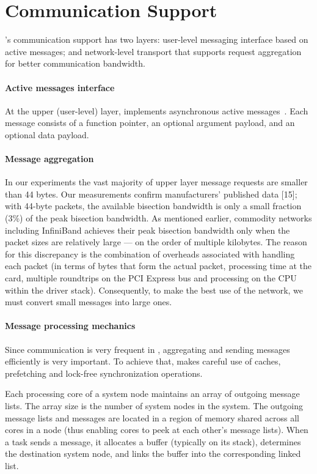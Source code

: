 \section{Communication Support}
\label{sec:communication}

\Grappa's communication support has two layers: user-level messaging interface
based on active messages; and network-level transport that supports request
aggregation for better communication bandwidth.

\paragraph{Active messages interface} At the upper (user-level) layer, \Grappa
implements asynchronous active messages~\cite{vonEicken92}. Each message
consists of a function pointer, an optional argument payload, and an optional
data payload. 

\paragraph{Message aggregation} In our experiments the vast majority of upper
layer message requests are smaller than 44 bytes. Our measurements confirm
manufacturers' published data [15]; with 44-byte packets, the available
bisection bandwidth is only a small fraction (3\%) of the peak bisection
bandwidth. As mentioned earlier, commodity networks including InfiniBand
achieves their peak bisection bandwidth only when the packet sizes are
relatively large --- on the order of multiple kilobytes. The reason for this
discrepancy is the combination of overheads associated with handling each
packet (in terms of bytes that form the actual packet, processing time at the
card, multiple roundtrips on the PCI Express bus and processing on the CPU
within the driver stack). Consequently, to make the best use of the network,
we must convert small messages into large ones.

\paragraph{Message processing mechanics} Since communication is very frequent
in \Grappa, aggregating and sending messages efficiently is very important. To
achieve that, \Grappa makes careful use of caches, prefetching and lock-free
synchronization operations.

Each processing core of a system node maintains an array of outgoing message lists.  The array size is the number of system nodes in the \Grappa system.   The outgoing message lists and messages are located in a region of memory shared across all cores in a \Grappa node (thus enabling cores to peek at each other's message lists). When a task sends a message, it allocates a buffer (typically on its stack), determines the destination system node, and links the buffer into the corresponding linked list.


